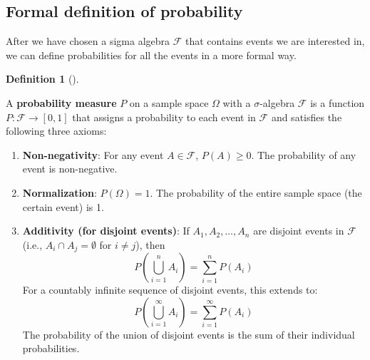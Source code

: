 \documentclass[
  letterpaper,
  DIV=11,
  numbers=noendperiod]{scrreport}
\theoremstyle{definition}
\theoremstyle{plain}
\theoremstyle{definition}
\newtheorem{definition}{Definition}[chapter]
\theoremstyle{plain}
\theoremstyle{remark}
\begin{document}
\subsection{Formal definition of
probability}\label{formal-definition-of-probability}

After we have chosen a sigma algebra \(\mathcal F\) that contains events
we are interested in, we can define probabilities for all the events in
a more formal way.

\begin{tcolorbox}[enhanced jigsaw, breakable, opacityback=0, leftrule=.75mm, colback=white, bottomtitle=1mm, coltitle=black, toptitle=1mm, titlerule=0mm, bottomrule=.15mm, colframe=quarto-callout-note-color-frame, title={Probability Measure (Kolmogorov's Axioms)}, opacitybacktitle=0.6, colbacktitle=quarto-callout-note-color!10!white, rightrule=.15mm, arc=.35mm, toprule=.15mm, left=2mm]

\begin{definition}[]\protect\hypertarget{def-probability-measure}{}\label{def-probability-measure}

A \textbf{probability measure} \(P\) on a sample space \(\Omega\) with a
\(\sigma\)-algebra \(\mathcal{F}\) is a function
\(P: \mathcal{F} \to [0, 1]\) that assigns a probability to each event
in \(\mathcal{F}\) and satisfies the following three axioms:

\begin{enumerate}
\def\labelenumi{\arabic{enumi}.}
\item
  \textbf{Non-negativity}: For any event \(A \in \mathcal{F}\),
  \(P(A) \ge 0\). The probability of any event is non-negative.
\item
  \textbf{Normalization}: \(P(\Omega) = 1\). The probability of the
  entire sample space (the certain event) is 1.
\item
  \textbf{Additivity (for disjoint events)}: If \(A_1, A_2, \dots, A_n\)
  are disjoint events in \(\mathcal{F}\) (i.e.,
  \(A_i \cap A_j = \emptyset\) for \(i \ne j\)), then
  \[ P\left(\bigcup_{i=1}^n A_i\right) = \sum_{i=1}^n P(A_i) \] For a
  countably infinite sequence of disjoint events, this extends to:
  \[ P\left(\bigcup_{i=1}^\infty A_i\right) = \sum_{i=1}^\infty P(A_i) \]
  The probability of the union of disjoint events is the sum of their
  individual probabilities.
\end{enumerate}

\end{definition}

\end{tcolorbox}
\end{document}
